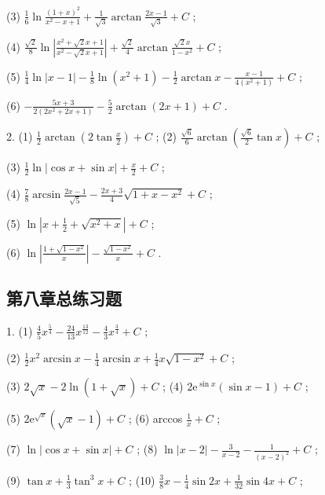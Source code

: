 (3) \(\frac{1}{6}\ln \frac{{\left( 1 + x\right) }^{2}}{{x}^{2} - x + 1} + \frac{1}{\sqrt{3}}\arctan \frac{{2x} - 1}{\sqrt{3}} + C\) ;

(4) \(\frac{\sqrt{2}}{8}\ln \left| \frac{{x}^{2} + \sqrt{2}x + 1}{{x}^{2} - \sqrt{2}x + 1}\right|  + \frac{\sqrt{2}}{4}\arctan \frac{\sqrt{2}x}{1 - {x}^{2}} + C\) ;

(5) \(\frac{1}{4}\ln \left| {x - 1}\right|  - \frac{1}{8}\ln \left( {{x}^{2} + 1}\right)  - \frac{1}{2}\arctan x - \frac{x - 1}{4\left( {{x}^{2} + 1}\right) } + C\) ;

(6) \(- \frac{{5x} + 3}{2\left( {2{x}^{2} + {2x} + 1}\right) } - \frac{5}{2}\arctan \left( {{2x} + 1}\right)  + C\) .

2. (1) \(\frac{1}{2}\arctan \left( {2\tan \frac{x}{2}}\right)  + C\) ; (2) \(\frac{\sqrt{6}}{6}\arctan \left( {\frac{\sqrt{6}}{2}\tan x}\right)  + C\) ;

(3) \(\frac{1}{2}\ln \left| {\cos x + \sin x}\right|  + \frac{x}{2} + C\) ;

(4) \(\frac{7}{8}\arcsin \frac{{2x} - 1}{\sqrt{5}} - \frac{{2x} + 3}{4}\sqrt{1 + x - {x}^{2}} + C\) ;

(5) \(\ln \left| {x + \frac{1}{2} + \sqrt{{x}^{2} + x}}\right|  + C\) ;

(6) \(\ln \left| \frac{1 + \sqrt{1 - {x}^{2}}}{x}\right|  - \frac{\sqrt{1 - {x}^{2}}}{x} + C\) .

\subsection{第八章总练习题}

1. (1) \(\frac{4}{5}{x}^{\frac{5}{4}} - \frac{24}{13}{x}^{\frac{13}{12}} - \frac{4}{3}{x}^{\frac{3}{4}} + C\) ;

(2) \(\frac{1}{2}{x}^{2}\arcsin x - \frac{1}{4}\arcsin x + \frac{1}{4}x\sqrt{1 - {x}^{2}} + C\) ;

(3) \(2\sqrt{x} - 2\ln \left( {1 + \sqrt{x}}\right)  + C\) ; (4) \(2{\mathrm{e}}^{\sin x}\left( {\sin x - 1}\right)  + C\) ;

(5) \(2{\mathrm{e}}^{\sqrt{x}}\left( {\sqrt{x} - 1}\right)  + C\) ; (6) arccos \(\frac{1}{x} + C\) ;

(7) \(\ln \left| {\cos x + \sin x}\right|  + C\) ; (8) \(\ln \left| {x - 2}\right|  - \frac{3}{x - 2} - \frac{1}{{\left( x - 2\right) }^{2}} + C\) ;

(9) \(\tan x + \frac{1}{3}{\tan }^{3}x + C\) ; (10) \(\frac{3}{8}x - \frac{1}{4}\sin {2x} + \frac{1}{32}\sin {4x} + C\) ;

